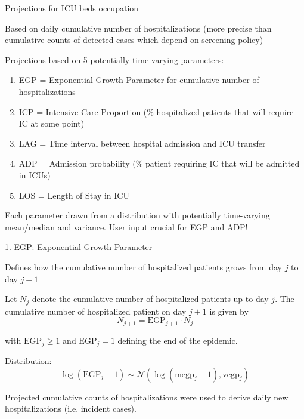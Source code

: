 \documentclass[t,9pt,xcolor=dvipsnames]{beamer}              %
\begin{document}
\begin{frame}{Projections for ICU beds occupation}

Based on daily \alert{cumulative number of hospitalizations} (more precise than cumulative counts of detected cases which depend on screening policy)
\medskip

Projections based on 5 potentially time-varying parameters:

\begin{enumerate}
\item \alert{EGP} = Exponential Growth Parameter for cumulative number of hospitalizations
\bigskip

\item \alert{ICP} = Intensive Care Proportion (\% hospitalized patients that will require IC at some point)
\bigskip

\item \alert{LAG} = Time interval between hospital admission and ICU transfer
\bigskip

\item \alert{ADP} = Admission probability (\% patient requiring IC that will be admitted in ICUs)
\bigskip

\item \alert{LOS} = Length of Stay in ICU
\end{enumerate}

Each parameter drawn from a distribution with potentially time-varying mean/median and variance. User input crucial for EGP and ADP!

\end{frame}

\begin{frame}{1. EGP: Exponential Growth Parameter}

Defines how the \alert{cumulative number of hospitalized patients} grows from day $j$ to day $j+1$

Let $N_{j}$ denote the cumulative number of hospitalized patients up to day $j$. The cumulative number of hospitalized patient on day $j+1$ is  given by
\begin{equation*}
N_{j+1}= \text{EGP}_{j+1} \cdot N_{j}
\end{equation*}

with $\text{EGP}_{j} \geq 1$ and $\text{EGP}_{j}=1$ defining the end of the epidemic.
\medskip

Distribution:
\begin{equation*}
\log(\text{EGP}_{j}-1) \sim \mathcal{N}\left(\log(\text{megp}_{j}-1), \text{vegp}_{j}\right)
\end{equation*}
\medskip

Projected cumulative counts of hospitalizations were used to derive daily new hospitalizations (i.e. incident cases).

\note{
\tiny
\justifying

}
\end{frame}
\end{document}
